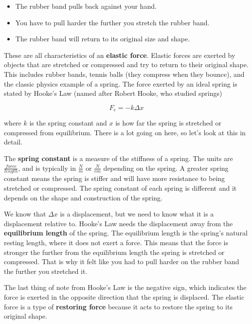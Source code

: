 \documentclass[12pt]{book}
\begin{document}
\begin{itemize}
\item The rubber band pulls back against your hand.
\item You have to pull harder the further you stretch the rubber band.
\item The rubber band will return to its original size and shape.
\end{itemize}

These are all characteristics of an \textbf{elastic force}. Elastic forces are exerted by objects that are stretched or compressed and try to return to their original shape. This includes rubber bands, tennis balls (they compress when they bounce), and the classic physics example of a spring. The force exerted by an ideal spring is stated by Hooke's Law (named after Robert Hooke, who studied springs)

\begin{equation}
F_e = -k \Delta x
\label{hooke}
\end{equation}

where $k$ is the spring constant and $x$ is how far the spring is stretched or compressed from equilibrium. There is a lot going on here, so let's look at this in detail.

The \textbf{spring constant} is a measure of the stiffness of a spring. The units are $\frac{force}{length}$, and is typically in $\frac{N}{m}$ or $\frac{N}{cm}$ depending on the spring. A greater spring constant means the spring is stiffer and will have more resistance to being stretched or compressed. The spring constant of each spring is different and it depends on the shape and construction of the spring.

We know that $\Delta x$ is a displacement, but we need to know what it is a displacement relative to. Hooke's Law needs the displacement away from the \textbf{equilibrium length} of the spring. The equilibrium length is the spring's natural resting length, where it does not exert a force. This means that the force is stronger the further from the equilibrium length the spring is stretched or compressed. That is why it felt like you had to pull harder on the rubber band the further you stretched it.

The last thing of note from Hooke's Law is the negative sign, which indicates the force is exerted in the opposite direction that the spring is displaced. The elastic force is a type of \textbf{restoring force} because it acts to restore the spring to its original shape.
\end{document}
